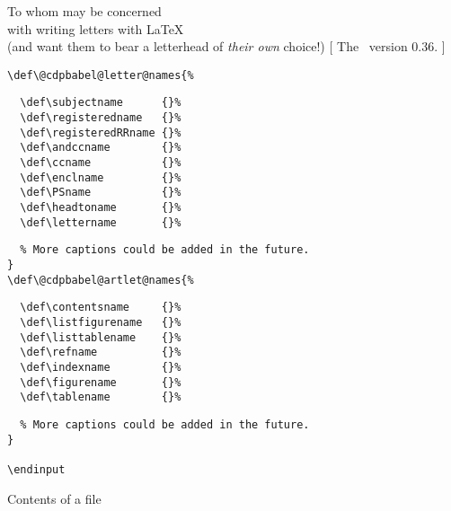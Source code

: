 \begin{letterhead}{
	To whom may be concerned\\
	with writing letters with \LaTeX\\
	(and want them to bear a letterhead
	of \emph{their own} choice!)
}[
	The \Bundle\ version 0.36.
]
\begin{listing}[tbp]
\begin{verbatim}
\def\@cdpbabel@letter@names{%
\end{verbatim}
	\begin{flushleft}
		\verb|  \def\subjectname      {|\verb|}%|\\
		\verb|  \def\registeredname   {|\verb|}%|\\
		\verb|  \def\registeredRRname {|\verb|}%|\\
		\verb|  \def\andccname        {|\verb|}%|\\
		\verb|  \def\ccname           {|\verb|}%|\\
		\verb|  \def\enclname         {|\verb|}%|\\
		\verb|  \def\PSname           {|\verb|}%|\\
		\verb|  \def\headtoname       {|\verb|}%|\\
		\verb|  \def\lettername       {|\verb|}%|
	\end{flushleft}
\begin{verbatim}
  % More captions could be added in the future.
}
\def\@cdpbabel@artlet@names{%
\end{verbatim}
	\begin{flushleft}
		\verb|  \def\contentsname     {|\verb|}%|\\
		\verb|  \def\listfigurename   {|\verb|}%|\\
		\verb|  \def\listtablename    {|\verb|}%|\\
		\verb|  \def\refname          {|\verb|}%|\\
		\verb|  \def\indexname        {|\verb|}%|\\
		\verb|  \def\figurename       {|\verb|}%|\\
		\verb|  \def\tablename        {|\verb|}%|\\
	\end{flushleft}
\begin{verbatim}
  % More captions could be added in the future.
}

\endinput
\end{verbatim}
	\caption{Contents of a
		\protect{} file}
	\label{lis:cdpnames}
	\cleanbot
\end{listing}


\end{letterhead}
